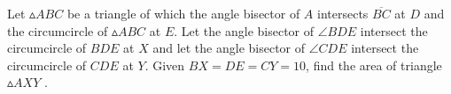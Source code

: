 Let $\vartriangle ABC$ be a triangle of which the angle bisector of $A$ intersects $\overline{BC}$ at $D$ and the circumcircle of $\vartriangle ABC$ at $E$. Let the angle bisector of $\angle BDE$ intersect the circumcircle of $BDE$ at $X$ and let the angle bisector of $\angle CDE$ intersect the circumcircle of $CDE$ at $Y$. Given $BX = DE = CY = 10$, find the area of triangle $\vartriangle AXY$ .
